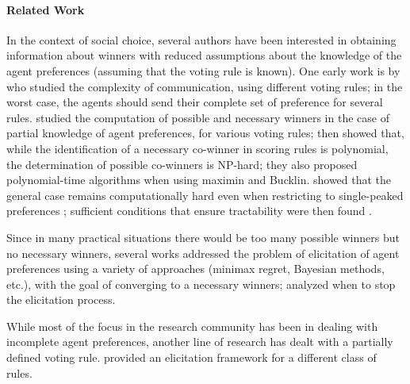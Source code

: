 \documentclass{article}
\begin{document}
\paragraph{Related Work}
\label{sec:related}
In the context of social choice, several authors have been interested in obtaining information about winners with reduced assumptions about the knowledge of the agent preferences (assuming that the voting rule is known). One early work is  by  who studied the complexity of communication, using different voting rules; %
in the worst case, the agents should send their complete set of preference for several rules. 
 studied the computation of possible and necessary winners in the case of partial knowledge of agent preferences, for various voting rules; %
\citet{Xia2008} then showed that, while the identification of a necessary co-winner in scoring rules is polynomial,  the determination of possible co-winners is NP-hard; they also  proposed polynomial-time algorithms when using maximin and Bucklin.
\citep{Walsh2007} showed that the general case remains computationally hard even when restricting to single-peaked preferences \citep{Walsh2007};  sufficient conditions that ensure tractability were then found \citep{Pini2007}.


Since in many practical situations there would be too many possible winners but no necessary winners, %
several works addressed the problem of  elicitation of agent preferences \citep{Naamani-Dery2015,Kalech2011,Lu2011,Pini2009,Benabbou2016,Dey2016,Dey2016_2}  using a variety of approaches (minimax regret, Bayesian methods, etc.), with the goal of converging to a necessary winners; \citep{Walsh2009,Conitzer2009}  analyzed when to stop the elicitation process.

While most of the focus in the research community has been in dealing with incomplete agent preferences, 
another line of research \citep{Stein1994,Llamazares2013,Viappiani2018} has dealt with %
a  partially defined voting rule.
 provided an elicitation framework for a different class of rules.
\end{document}
